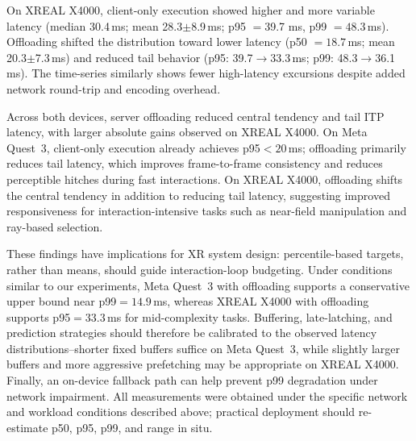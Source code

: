 On XREAL X4000, client-only execution showed higher and more variable latency (median 30.4\,ms; mean 28.3$\pm$8.9\,ms; p95 $=$39.7 ms, p99 $=48.3$\,ms). 
Offloading shifted the distribution toward lower latency (p50 $=18.7$\,ms; mean 20.3$\pm$7.3\,ms) and reduced tail behavior (p95: 39.7$\rightarrow$33.3\,ms; p99: 48.3$\rightarrow$36.1\,ms). The time-series similarly shows fewer high-latency excursions despite added network round-trip and encoding overhead.

Across both devices, server offloading reduced central tendency and tail ITP latency, with larger absolute gains observed on XREAL X4000.
On Meta Quest~3, client-only execution already achieves p95$<20$\,ms; offloading primarily reduces tail latency, which improves frame-to-frame consistency and reduces perceptible hitches during fast interactions. 
On XREAL X4000, offloading shifts the central tendency in addition to reducing tail latency, suggesting improved responsiveness for interaction-intensive tasks such as near-field manipulation and ray-based selection.

These findings have implications for XR system design: percentile-based targets, rather than means, should guide interaction-loop budgeting.
Under conditions similar to our experiments, Meta Quest~3 with offloading supports a conservative upper bound near p99$=14.9$\,ms, whereas XREAL X4000 with offloading supports p95$=33.3$\,ms for mid-complexity tasks. 
Buffering, late-latching, and prediction strategies should therefore be calibrated to the observed latency distributions--shorter fixed buffers suffice on Meta Quest~3, while slightly larger buffers and more aggressive prefetching may be appropriate on XREAL X4000. 
Finally, an on-device fallback path can help prevent p99 degradation under network impairment. All measurements were obtained under the specific network and workload conditions described above; practical deployment should re-estimate p50, p95, p99, and range in situ.



